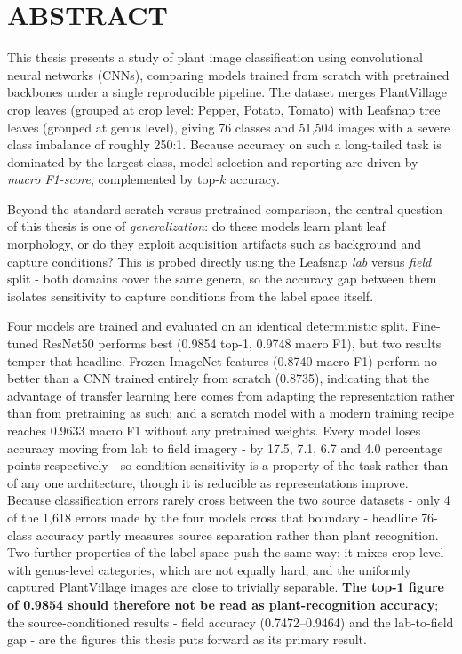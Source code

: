 \documentclass[12pt,a4paper]{article}
\begin{document}
\renewcommand{\listfigurename}{LIST OF FIGURES}
\listoffigures
\clearpage

\section*{ABSTRACT}
This thesis presents a study of plant image classification using convolutional neural networks (CNNs), comparing models trained from scratch with pretrained backbones under a single reproducible pipeline. The dataset merges PlantVillage crop leaves (grouped at crop level: Pepper, Potato, Tomato) with Leafsnap tree leaves (grouped at genus level), giving 76 classes and 51{,}504 images with a severe class imbalance of roughly 250:1. Because accuracy on such a long-tailed task is dominated by the largest class, model selection and reporting are driven by \emph{macro F1-score}, complemented by top-$k$ accuracy.

Beyond the standard scratch-versus-pretrained comparison, the central question of this thesis is one of \emph{generalization}: do these models learn plant leaf morphology, or do they exploit acquisition artifacts such as background and capture conditions? This is probed directly using the Leafsnap \emph{lab} versus \emph{field} split - both domains cover the same genera, so the accuracy gap between them isolates sensitivity to capture conditions from the label space itself.

Four models are trained and evaluated on an identical deterministic split. Fine-tuned ResNet50 performs best (0.9854 top-1, 0.9748 macro F1), but two results temper that headline. Frozen ImageNet features (0.8740 macro F1) perform no better than a CNN trained entirely from scratch (0.8735), indicating that the advantage of transfer learning here comes from adapting the representation rather than from pretraining as such; and a scratch model with a modern training recipe reaches 0.9633 macro F1 without any pretrained weights. Every model loses accuracy moving from lab to field imagery - by 17.5, 7.1, 6.7 and 4.0 percentage points respectively - so condition sensitivity is a property of the task rather than of any one architecture, though it is reducible as representations improve. Because classification errors rarely cross between the two source datasets - only 4 of the 1{,}618 errors made by the four models cross that boundary - headline 76-class accuracy partly measures source separation rather than plant recognition. Two further properties of the label space push the same way: it mixes crop-level with genus-level categories, which are not equally hard, and the uniformly captured PlantVillage images are close to trivially separable. \textbf{The top-1 figure of 0.9854 should therefore not be read as plant-recognition accuracy}; the source-conditioned results - field accuracy (0.7472--0.9464) and the lab-to-field gap - are the figures this thesis puts forward as its primary result.
\end{document}

